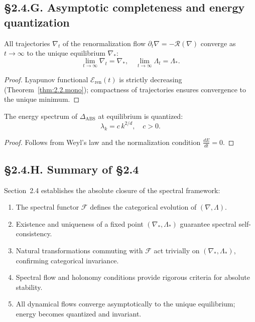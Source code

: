 \subsection*{§2.4.G. Asymptotic completeness and energy quantization}

\begin{theorem}\label{thm:2.4.comp}
All trajectories $\nabla_t$ of the renormalization flow $\partial_t\nabla=-\mathcal{R}(\nabla)$ converge as $t\to\infty$ to the unique equilibrium $\nabla_\ast$:
\[
\lim_{t\to\infty}\nabla_t = \nabla_\ast,\quad
\lim_{t\to\infty}\Lambda_t = \Lambda_\ast.
\]
\]
\end{theorem}

\begin{proof}
Lyapunov functional $\mathcal{E}_{\mathrm{ren}}(t)$ is strictly decreasing (Theorem~\ref{thm:2.2.mono}); compactness of trajectories ensures convergence to the unique minimum.
\end{proof}

\begin{corollary}
The energy spectrum of $\Delta_{\mathrm{ABS}}$ at equilibrium is quantized:
\[
\lambda_k = c\,k^{2/d},\quad c>0.
\]
\end{corollary}

\begin{proof}
Follows from Weyl’s law and the normalization condition $\frac{dE}{dt}=0$.
\end{proof}

\subsection*{§2.4.H. Summary of §2.4}

Section~2.4 establishes the absolute closure of the spectral framework:
\begin{enumerate}
  \item The spectral functor $\mathcal{F}$ defines the categorical evolution of $(\nabla,\Lambda)$.
  \item Existence and uniqueness of a fixed point $(\nabla_\ast,\Lambda_\ast)$ guarantee spectral self-consistency.
  \item Natural transformations commuting with $\mathcal{F}$ act trivially on $(\nabla_\ast,\Lambda_\ast)$, confirming categorical invariance.
  \item Spectral flow and holonomy conditions provide rigorous criteria for absolute stability.
  \item All dynamical flows converge asymptotically to the unique equilibrium; energy becomes quantized and invariant.
\end{enumerate}

